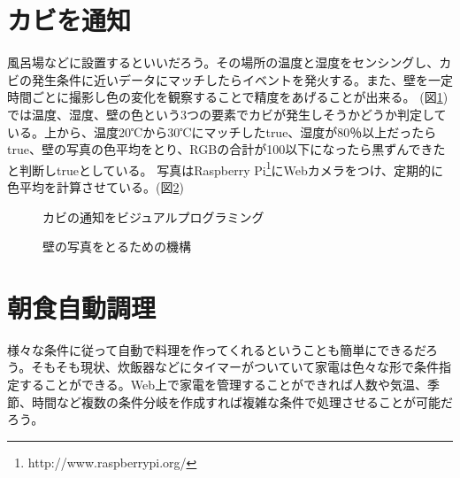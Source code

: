 \section{カビを通知}
風呂場などに設置するといいだろう。その場所の温度と湿度をセンシングし、カビの発生条件に近いデータにマッチしたらイベントを発火する。また、壁を一定時間ごとに撮影し色の変化を観察することで精度をあげることが出来る。
(図\ref{fig:image13})では温度、湿度、壁の色という3つの要素でカビが発生しそうかどうか判定している。上から、温度20℃から30℃にマッチしたtrue、湿度が80％以上だったらtrue、壁の写真の色平均をとり、RGBの合計が100以下になったら黒ずんできたと判断しtrueとしている。
写真はRaspberry Pi\footnote{http://www.raspberrypi.org/}にWebカメラをつけ、定期的に色平均を計算させている。(図\ref{fig:image15})
\begin{figure}[htbp]
  \begin{center}
  \end{center}
  \caption{カビの通知をビジュアルプログラミング}
  \label{fig:image13}
\end{figure}

\begin{figure}[htbp]
  \begin{center}
  \end{center}
  \caption{壁の写真をとるための機構}
  \label{fig:image15}
\end{figure}

\section{朝食自動調理}
様々な条件に従って自動で料理を作ってくれるということも簡単にできるだろう。そもそも現状、炊飯器などにタイマーがついていて家電は色々な形で条件指定することができる。Web上で家電を管理することができれば人数や気温、季節、時間など複数の条件分岐を作成すれば複雑な条件で処理させることが可能だろう。

